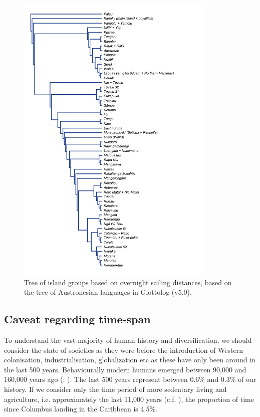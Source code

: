 \documentclass[unnumsec,webpdf,modern,medium]{oup-authoring-template}
\begin{document}
\begin{figure}[ht]
\includegraphics[width=0.85\textwidth]{island_group_tree_SBZR.png}
\caption{Tree of island groups based on overnight sailing distances, based on the tree of Austronesian languages in Glottolog (v5.0).}
\label{island_group_tree_SBZR}
\end{figure}

\newpage
\FloatBarrier

\subsection{Caveat regarding time-span}
\label{appendix_time_span}

To understand the vast majority of human history and diversification, we should consider the state of societies as they were before the introduction of Western colonisation, industrialisation, globalization etc as these have only been around in the last 500 years. Behaviourally modern humans emerged between 90,000 and 160,000 years ago (\citet{powell2009late}: \cite{marean2007early}). The last 500 years represent between 0.6\% and 0.3\% of our history. If we consider only the time period of more sedentary living and agriculture, i.e. approximately the last 11,000 years (c.f. \citet{kislev2006early}), the proportion of time since Columbus landing in the Caribbean is 4.5\%.
\end{document}

